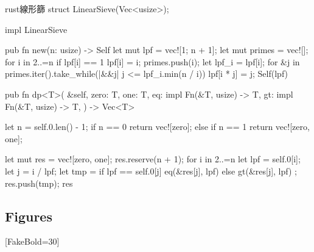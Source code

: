 \documentclass[lualatex, ja=standard]{ltjsarticle}
\begin{document}
\begin{samplecode}{rust}{線形篩}
struct LinearSieve(Vec<usize>);

impl LinearSieve {
    pub fn new(n: usize) -> Self {
        let mut lpf = vec![1; n + 1];
        let mut primes = vec![];
        for i in 2..=n {
            if lpf[i] == 1 {
                lpf[i] = i;
                primes.push(i);
            }
            let lpf_i = lpf[i];
            for &j in primes.iter().take_while(|&&j| j <= lpf_i.min(n / i)) {
                lpf[i * j] = j;
            }
        }
        Self(lpf)
    }

    pub fn dp<T>(
        &self,
        zero: T,
        one: T,
        eq: impl Fn(&T, usize) -> T,
        gt: impl Fn(&T, usize) -> T,
    ) -> Vec<T> {
        let n = self.0.len() - 1;
        if n == 0 {
            return vec![zero];
        } else if n == 1 {
            return vec![zero, one];
        }

        let mut res = vec![zero, one];
        res.reserve(n + 1);
        for i in 2..=n {
            let lpf = self.0[i];
            let j = i / lpf;
            let tmp = if lpf == self.0[j] { eq(&res[j], lpf) } else { gt(&res[j], lpf) };
            res.push(tmp);
        }
        res
    }
}
\end{samplecode}


\subsection{Figures}

\newfontfamily{}[FakeBold=30]
\newcommand{\bordered}[1]{\tikz{\node[text=white]{\fakebolded#1};\node{#1}}}
\newcommand{\gpf}{\operatorname{gpf}}
\end{document}
